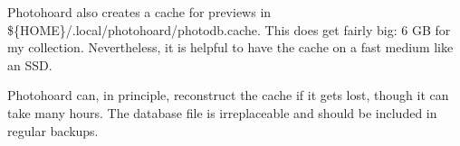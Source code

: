 \documentclass[11pt]{report}
\begin{document}
Photohoard also creates a cache for previews in
\$\{HOME\}/.local/photohoard/photodb.cache. This does get fairly big:
6 GB for my collection. Nevertheless, it is helpful to have the cache
on a fast medium like an SSD.

Photohoard can, in principle, reconstruct the cache if it gets lost,
though it can take many hours. The database file is irreplaceable
and should be included in regular backups.
\end{document}
